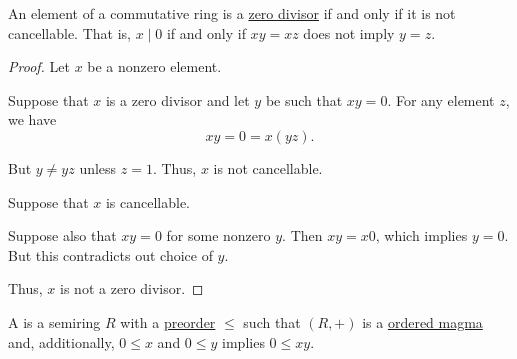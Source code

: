 \begin{proposition}\label{thm:semiring_cancellative_iff_no_zero_divisors}
  An element of a commutative ring is a \hyperref[def:semiring_division]{zero divisor} if and only if it is not cancellable. That is, \( x \mid 0 \) if and only if \( xy = xz \) does not imply \( y = z \).
\end{proposition}
\begin{proof}
  Let \( x \) be a nonzero element.

  \SufficiencySubProof Suppose that \( x \) is a zero divisor and let \( y \) be such that \( xy = 0 \). For any element \( z \), we have
  \begin{equation*}
    xy = 0 = x(yz).
  \end{equation*}

  But \( y \neq yz \) unless \( z = 1 \). Thus, \( x \) is not cancellable.

  \NecessitySubProof Suppose that \( x \) is cancellable.

  Suppose also that \( xy = 0 \) for some nonzero \( y \). Then \( xy = x0 \), which implies \( y = 0 \). But this contradicts out choice of \( y \).

  Thus, \( x \) is not a zero divisor.
\end{proof}

\begin{definition}\label{def:ordered_semiring}
  A  is a semiring \( R \) with a \hyperref[def:preordered_set]{preorder} \( \leq \) such that \( (R, +) \) is a \hyperref[def:ordered_magma]{ordered magma} and, additionally, \( 0 \leq x \) and \( 0 \leq y \) implies \( 0 \leq xy \).
\end{definition}
